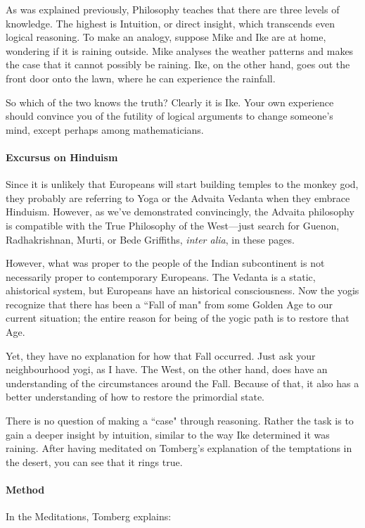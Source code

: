 As was explained previously, Philosophy teaches that there are three levels of knowledge. The highest is Intuition, or direct insight, which transcends even logical reasoning. To make an analogy, suppose Mike and Ike are at home, wondering if it is raining outside. Mike analyses the weather patterns and makes the case that it cannot possibly be raining. Ike, on the other hand, goes out the front door onto the lawn, where he can experience the rainfall.

So which of the two knows the truth? Clearly it is Ike. Your own experience should convince you of the futility of logical arguments to change someone's mind, except perhaps among mathematicians.

\paragraph{Excursus on Hinduism}
Since it is unlikely that Europeans will start building temples to the monkey god, they probably are referring to Yoga or the Advaita Vedanta when they embrace Hinduism. However, as we've demonstrated convincingly, the Advaita philosophy is compatible with the True Philosophy of the West—just search for Guenon, Radhakrishnan, Murti, or Bede Griffiths, \emph{inter alia}, in these pages.

However, what was proper to the people of the Indian subcontinent is not necessarily proper to contemporary Europeans. The Vedanta is a static, ahistorical system, but Europeans have an historical consciousness. Now the yogis recognize that there has been a ``Fall of man" from some Golden Age to our current situation; the entire reason for being of the yogic path is to restore that Age.

Yet, they have no explanation for how that Fall occurred. Just ask your neighbourhood yogi, as I have. The West, on the other hand, does have an understanding of the circumstances around the Fall. Because of that, it also has a better understanding of how to restore the primordial state.

There is no question of making a ``case" through reasoning. Rather the task is to gain a deeper insight by intuition, similar to the way Ike determined it was raining. After having meditated on Tomberg's explanation of the temptations in the desert, you can see that it rings true.

\paragraph{Method}
In the Meditations, Tomberg explains:

